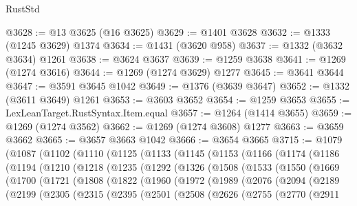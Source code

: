 \begin{lexlean}{RustStd}
\begin{coremodule}
{\begin{coremodule}
{{{{{{{{{{{{{{{{{{{{{{{{{{{{{{{{{{{@3628 := @13 @3625 (@16 @3625)
@3629 := @1401 @3628
@3632 := @1333 (@1245 @3629) @1374
@3634 := @1431 (@3620 @958)
@3637 := @1332 (@3632 @3634) @1261
@3638 := @3624 @3637
@3639 := @1259 @3638
@3641 := @1269 (@1274 @3616)
@3644 := @1269 (@1274 @3629) @1277
@3645 := @3641 @3644
@3647 := @3591 @3645 @1042
@3649 := @1376 (@3639 @3647)
@3652 := @1332 (@3611 @3649) @1261
@3653 := @3603 @3652
@3654 := @1259 @3653
@3655 := LexLeanTarget.RustSyntax.Item.equal
@3657 := @1264 (@1414 @3655)
@3659 := @1269 (@1274 @3562)
@3662 := @1269 (@1274 @3608) @1277
@3663 := @3659 @3662
@3665 := @3657 @3663 @1042
@3666 := @3654 @3665
@3715 := @1079
    (@1087
      (@1102
        (@1110
          (@1125
            (@1133
              (@1145
                (@1153
                  (@1166
                    (@1174
                      (@1186
                        (@1194
                          (@1210
                            (@1218
                              (@1235
                                (@1292
                                  (@1326
                                    (@1508
                                      (@1533
                                        (@1550
                                          (@1669
                                            (@1700
                                              (@1721
                                                (@1808
                                                  (@1822
                                                    (@1960
                                                      (@1972
                                                        (@1989
                                                          (@2076
                                                            (@2094
                                                              (@2189
                                                                (@2199
                                                                  (@2305
                                                                    (@2315
                                                                      (@2395
                                                                        (@2501
                                                                          (@2508
                                                                            (@2626
                                                                              (@2755
                                                                                (@2770
                                                                                  (@2911
}}}}}}}}}}}}}}}}}}}}}}}}}}}}}}}}}}}
\end{coremodule}}
\end{coremodule}
\end{lexlean}
